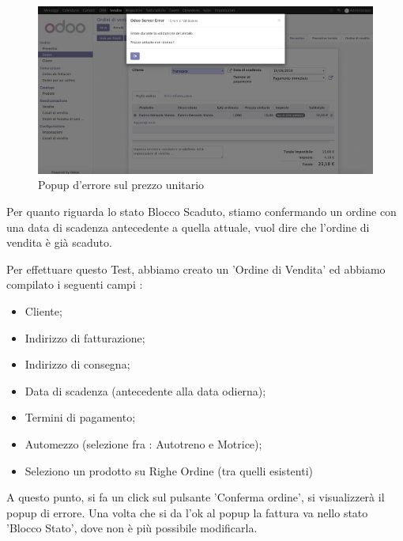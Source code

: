 \begin{figure}[H]
	\begin{center} \includegraphics[scale=0.3]{figures/error_price}
		\caption[Popup d'errore sul prezzo unitario]{Popup d'errore sul prezzo unitario}
		\label{fig:error_price}
	\end{center}
\end{figure}
Per quanto riguarda lo stato Blocco Scaduto, stiamo confermando un ordine con una data di scadenza antecedente a quella attuale, vuol dire che l'ordine di vendita è già scaduto.

\vspace*{0.5cm}
Per effettuare questo Test, abbiamo creato un 'Ordine di Vendita' ed abbiamo compilato i seguenti campi :

\begin{itemize}
	\item Cliente;
	\item Indirizzo di fatturazione;
	\item Indirizzo di consegna;
	\item Data di scadenza (antecedente alla data odierna);
	\item Termini di pagamento;
	\item Automezzo (selezione fra : Autotreno e Motrice);
	\item Seleziono un prodotto su Righe Ordine (tra quelli esistenti)
\end{itemize}

A questo punto, si fa un click sul pulsante 'Conferma ordine', si visualizzerà il popup di errore.
Una volta che si da l'ok al popup la fattura va nello stato 'Blocco Stato', dove non è più possibile modificarla.


